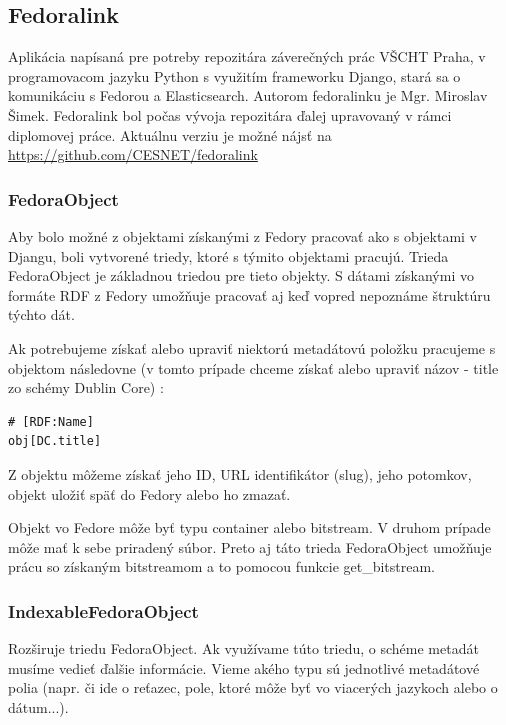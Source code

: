 \documentclass[thesis=M,slovak]{FITthesis}[2013/05/06]
\begin{document}
\subsection{Fedoralink}
Aplikácia napísaná pre potreby repozitára záverečných prác VŠCHT Praha, v programovacom jazyku Python s využitím frameworku Django, stará sa o komunikáciu s Fedorou a Elasticsearch. Autorom fedoralinku je Mgr. Miroslav Šimek. Fedoralink bol počas vývoja repozitára ďalej upravovaný v rámci diplomovej práce. Aktuálnu verziu je možné nájsť na \url{https://github.com/CESNET/fedoralink}

\subsubsection{FedoraObject}
Aby bolo možné z objektami získanými z Fedory pracovať ako s objektami v Djangu, boli vytvorené triedy, ktoré s týmito objektami pracujú. Trieda FedoraObject je základnou triedou pre tieto objekty. S dátami získanými vo formáte RDF z Fedory umožňuje pracovať aj keď vopred nepoznáme štruktúru týchto dát.

Ak potrebujeme získať alebo upraviť niektorú metadátovú položku pracujeme s objektom následovne (v tomto prípade chceme získať alebo upraviť názov - title zo schémy Dublin Core) : 
\begin{lstlisting}[frame=single] 
# [RDF:Name]
obj[DC.title]
\end{lstlisting}

Z objektu môžeme získať jeho ID, URL identifikátor (slug), jeho potomkov, objekt uložiť späť do Fedory alebo ho zmazať.

Objekt vo Fedore môže byť typu container alebo bitstream. V druhom prípade môže mať k sebe priradený súbor. Preto aj táto trieda FedoraObject umožňuje prácu so získaným bitstreamom a to pomocou funkcie get\_bitstream.

\subsubsection{IndexableFedoraObject}
Rozširuje triedu FedoraObject. Ak využívame túto triedu, o schéme metadát musíme vedieť ďalšie informácie. Vieme akého typu sú jednotlivé metadátové polia (napr. či ide o reťazec, pole, ktoré môže byť vo viacerých jazykoch alebo o dátum...).
\end{document}
